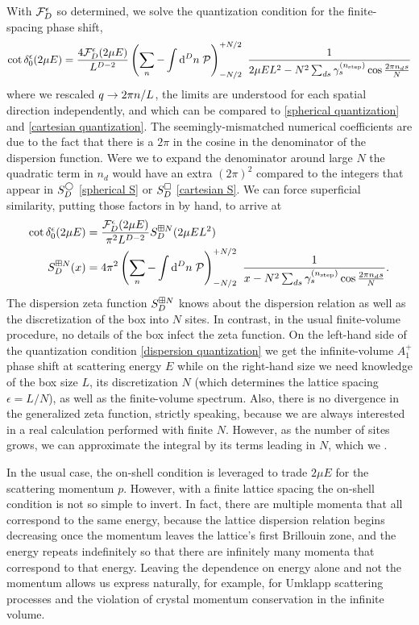 With $\mathcal{F}_D^\epsilon$ so determined, we solve the quantization condition for the finite-spacing phase shift,
\begin{align}
    \cot \delta_0^\epsilon(2\mu E)
    =
    \frac{4\mathcal{F}_D^\epsilon(2\mu E)}{L^{D-2}}
    \left(\sum_n - \int \mathrm{d}^D n\; \mathcal{P} \right)_{-N/2}^{+N/2}\  \frac{1}{2\mu E L^2 - N^2 \sum_{ds} \gamma^{({n_\text{step}})}_s \cos \frac{2\pi n_d s}{N}}
\end{align}
where we rescaled $q\rightarrow 2\pi n/L$, the limits are understood for each spatial direction independently, and which can be compared to \eqref{spherical quantization} and \eqref{cartesian quantization}.  The seemingly-mismatched numerical coefficients are due to the fact that there is a $2\pi$ in the cosine in the denominator of the dispersion function.
Were we to expand the denominator around large $N$ the quadratic term in $n_d$ would have an extra $(2\pi)^2$ compared to the integers that appear in $S^\bigcirc_D$ \eqref{spherical S} or $S^\square_D$ \eqref{cartesian S}.  We can force superficial similarity, putting those factors in by hand, to arrive at
\begin{align}
    \label{eq:dispersion quantization}
    \cot \delta_0^{\epsilon}( 2\mu E ) &= \frac{\mathcal{F}_D^\epsilon(2\mu E)}{\pi^2 L^{D-2}} S^{\boxplus N}_{D}(2\mu E L^2)
    \\
    \label{eq:dispersion S}
    S^{\boxplus N}_{D}( x )
    &=
    4\pi^2
    \left(\sum_n - \int \mathrm{d}^D n\; \mathcal{P} \right)_{-N/2}^{+N/2}\  \frac{1}{x - N^2 \sum_{ds} \gamma^{({n_\text{step}})}_s \cos \frac{2\pi n_d s}{N}}.
\end{align}
The dispersion zeta function $S^{\boxplus N}_{D}$ knows about the dispersion relation as well as the discretization of the box into $N$ sites.
In contrast, in the usual finite-volume procedure, no details of the box infect the zeta function.
On the left-hand side of the quantization condition \eqref{dispersion quantization} we get the infinite-volume $A_1^+$ phase shift at scattering energy $E$ while on the right-hand size we need knowledge of the box size $L$, its discretization $N$ (which determines the lattice spacing $\epsilon=L/N$), as well as the finite-volume spectrum.
Also, there is no divergence in the generalized zeta function, strictly speaking, because we are always interested in a real calculation performed with finite $N$.
However, as the number of sites grows, we can approximate the integral by its terms leading in $N$, which we .

In the usual case, the on-shell condition is leveraged to trade $2\mu E$ for the scattering momentum $p$.  However, with a finite lattice spacing the on-shell condition is not so simple to invert.
In fact, there are multiple momenta that all correspond to the same energy, because the lattice dispersion relation begins decreasing once the momentum leaves the lattice's first Brillouin zone, and the energy repeats indefinitely so that there are infinitely many momenta that correspond to that energy.
Leaving the dependence on energy alone and not the momentum allows us express naturally, for example, for Umklapp scattering processes and the violation of crystal momentum conservation in the infinite volume.

